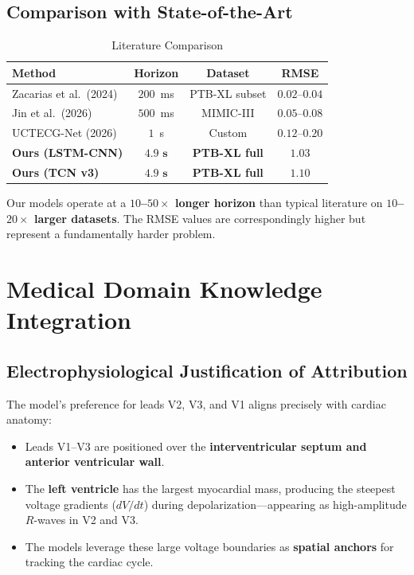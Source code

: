 \documentclass[10pt,journal,compsoc]{IEEEtran}
\begin{document}
\subsection{Comparison with State-of-the-Art}

\begin{table}[h]
\caption{Literature Comparison}
\label{tab:literature}
\centering
\begin{tabular}{lccc}
\toprule
\textbf{Method} & \textbf{Horizon} & \textbf{Dataset} & \textbf{RMSE} \\
\midrule
Zacarias et al.\ (2024) & $200$~ms & PTB-XL subset & $0.02$--$0.04$ \\
Jin et al.\ (2026) & $500$~ms & MIMIC-III & $0.05$--$0.08$ \\
UCTECG-Net (2026) & $1$~s & Custom & $0.12$--$0.20$ \\
\midrule
\textbf{Ours (LSTM-CNN)} & $\mathbf{4.9\textbf{ s}}$ & \textbf{PTB-XL full} & $\mathbf{1.03}$ \\
\textbf{Ours (TCN v3)} & $\mathbf{4.9\textbf{ s}}$ & \textbf{PTB-XL full} & $\mathbf{1.10}$ \\
\bottomrule
\end{tabular}
\end{table}

\noindent Our models operate at a \textbf{$10$--$50\times$ longer horizon} than typical literature on \textbf{$10$--$20\times$ larger datasets}. The RMSE values are correspondingly higher but represent a fundamentally harder problem.

\section{Medical Domain Knowledge Integration}
\label{sec:domain}

\subsection{Electrophysiological Justification of Attribution}

The model's preference for leads V2, V3, and V1 aligns precisely with cardiac anatomy:
\begin{itemize}
    \item Leads V1--V3 are positioned over the \textbf{interventricular septum and anterior ventricular wall}.
    \item The \textbf{left ventricle} has the largest myocardial mass, producing the steepest voltage gradients ($dV/dt$) during depolarization---appearing as high-amplitude $R$-waves in V2 and V3.
    \item The models leverage these large voltage boundaries as \textbf{spatial anchors} for tracking the cardiac cycle.
\end{itemize}
\end{document}

